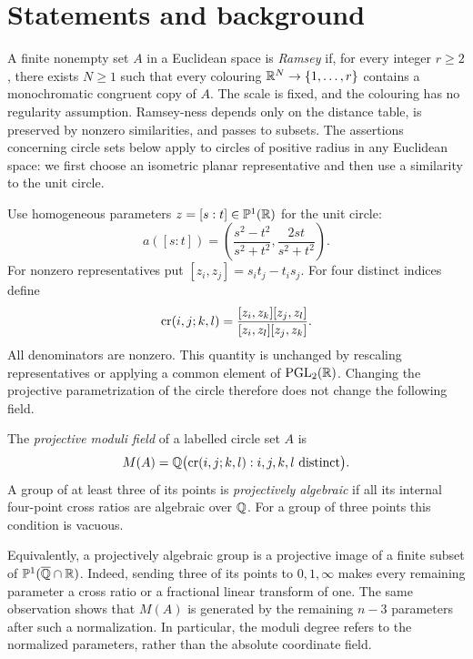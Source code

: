 \section{Statements and background}\label{sec:introduction}

A finite nonempty set $A$ in a Euclidean space is \emph{Ramsey} if, for
every integer $r\ge2$, there exists $N\ge1$ such that every colouring
$\mathbb R^N\to\{1,\ldots,r\}$ contains a monochromatic congruent copy of $A$.
The scale is fixed, and the colouring has no regularity assumption.
Ramsey-ness depends only on the distance table, is preserved by nonzero
similarities, and passes to subsets. The assertions concerning circle
sets below apply to circles of positive radius in any Euclidean space:
we first choose an isometric planar representative and then use a
similarity to the unit circle.

Use homogeneous parameters $z=[s:t]\in\mathbb P^1(\mathbb R)$ for the unit circle:
\begin{equation}\label{eq:circle-map}
 a([s:t])=\left(\frac{s^2-t^2}{s^2+t^2},
                       \frac{2st}{s^2+t^2}\right).
\end{equation}
For nonzero representatives put $[z_i,z_j]=s_it_j-t_is_j$. For four
distinct indices define
\begin{equation}\label{eq:cross-ratio}
 \operatorname{cr}(i,j;k,l)=
 \frac{[z_i,z_k][z_j,z_l]}{[z_i,z_l][z_j,z_k]}.
\end{equation}
All denominators are nonzero. This quantity is unchanged by rescaling
representatives or applying a common element of $\mathrm{PGL}_2(\mathbb R)$.
Changing the projective parametrization of the circle therefore does
not change the following field.

\begin{definition}\label{def:moduli}
The \emph{projective moduli field} of a labelled circle set $A$ is
\[
 M(A)=\mathbb Q\bigl(\operatorname{cr}(i,j;k,l):i,j,k,l\text{ distinct}\bigr).
\]
A group of at least three of its points is \emph{projectively algebraic}
if all its internal four-point cross ratios are algebraic over $\mathbb Q$.
For a group of three points this condition is vacuous.
\end{definition}

Equivalently, a projectively algebraic group is a projective image of a
finite subset of $\mathbb P^1(\overline{\mathbb Q}\cap\mathbb R)$. Indeed, sending three of
its points to $0,1,\infty$ makes every remaining parameter a cross ratio
or a fractional linear transform of one. The same observation shows
that $M(A)$ is generated by the remaining $n-3$ parameters after such a
normalization. In particular, the moduli degree refers to the normalized
parameters, rather than the absolute coordinate field.

